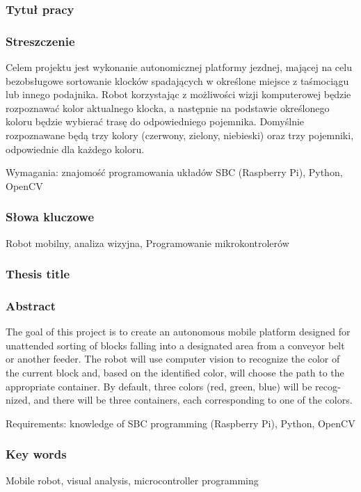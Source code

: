 \subsubsection*{Tytuł pracy} 
\Title

\subsubsection*{Streszczenie}  
Celem projektu jest wykonanie autonomicznej platformy jezdnej, mającej na celu
bezobsługowe sortowanie klocków spadających w określone miejsce z taśmociągu lub innego podajnika. Robot korzystając z możliwości wizji komputerowej będzie
rozpoznawać kolor aktualnego klocka, a następnie na podstawie określonego koloru będzie wybierać trasę do odpowiedniego pojemnika. Domyślnie rozpoznawane będą trzy kolory (czerwony, zielony, niebieski) oraz trzy pojemniki, odpowiednie dla każdego koloru. 

Wymagania: znajomość programowania układów SBC (Raspberry Pi), Python, OpenCV


\subsubsection*{Słowa kluczowe} 
Robot mobilny, analiza wizyjna, Programowanie mikrokontrolerów

\subsubsection*{Thesis title} 
\begin{otherlanguage}{british}
\TitleAlt
\end{otherlanguage}

\subsubsection*{Abstract} 
\begin{otherlanguage}{british}
    The goal of this project is to create an autonomous mobile platform designed for unattended sorting of blocks falling into a designated area from a conveyor belt or another feeder. The robot will use computer vision to recognize the color of the current block and, based on the identified color, will choose the path to the appropriate container. By default, three colors (red, green, blue) will be recognized, and there will be three containers, each corresponding to one of the colors.
    
    Requirements: knowledge of SBC programming (Raspberry Pi), Python, OpenCV
\end{otherlanguage}

\subsubsection*{Key words}  
\begin{otherlanguage}{british}
Mobile robot, visual analysis, microcontroller programming
\end{otherlanguage}

